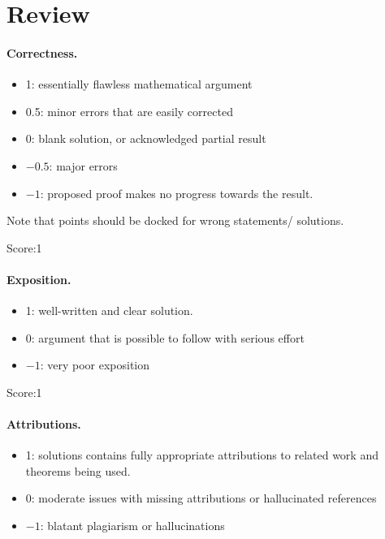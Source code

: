 \documentclass[11pt]{article}
\begin{document}
\maketitle

\section{Review}

\paragraph{Correctness.}
\begin{itemize}
	\item  1: essentially flawless mathematical argument
	\item  0.5: minor errors that are easily corrected
	\item  0: blank solution, or acknowledged partial result
	\item  $-0.5$: major errors
	\item  $-1$: proposed proof makes no progress towards the result.
\end{itemize}
Note that points should be docked for wrong statements/ solutions.

\noindent Score:1

\paragraph{Exposition.}
\begin{itemize}
	\item  1: well-written and clear solution.
	\item  0: argument that is possible to follow with serious effort
	\item  $-1$: very poor exposition
\end{itemize}

\noindent Score:1

\paragraph{Attributions.}
\begin{itemize}
	\item  1: solutions contains fully appropriate attributions
		to related work and theorems being used.
	\item  0: moderate issues with missing attributions or hallucinated references
	\item  $-1$: blatant plagiarism or hallucinations
\end{itemize}
\end{document}
